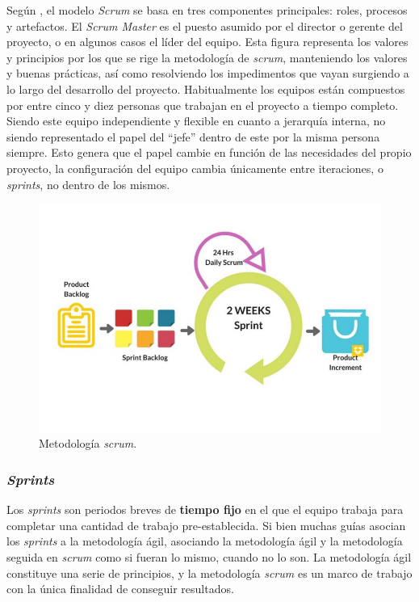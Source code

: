 Según \cite{cervone2011understanding}, el modelo \textit{Scrum} se basa en tres componentes principales: roles, procesos y artefactos. El \textit{Scrum Master} es el puesto asumido por el director o gerente del proyecto, o en algunos casos el líder del equipo. Esta figura representa los valores y principios por los que se rige la metodología de \textit{scrum}, manteniendo los valores y buenas prácticas, así como resolviendo los impedimentos que vayan surgiendo a lo largo del desarrollo del proyecto. Habitualmente los equipos están compuestos por entre cinco y diez personas que trabajan en el proyecto a tiempo completo. Siendo este equipo independiente y flexible en cuanto a jerarquía interna, no siendo representado el papel del ``jefe'' dentro de este por la misma persona siempre. Esto genera que el papel cambie en función de las necesidades del propio proyecto, la configuración del equipo cambia únicamente entre iteraciones, o \textit{sprints}, no dentro de los mismos.

\begin{figure}[]
	\centering
	\includegraphics[scale=0.5]{../img/anexos/overview-scrum}
	\caption{Metodología \textit{scrum}.}\label{img:scrum-overview}
\end{figure}

\subsubsection{\textit{Sprints}}
Los \textit{sprints} son periodos breves de \textbf{tiempo fijo} en el que el equipo trabaja para completar una cantidad de trabajo pre-establecida. Si bien muchas guías asocian los \textit{sprints} a la metodología ágil, asociando la metodología ágil y la metodología seguida en \textit{scrum} como si fueran lo mismo, cuando no lo son. La metodología ágil constituye una serie de principios, y la metodología \textit{scrum} es un marco de trabajo con la única finalidad de conseguir resultados.

